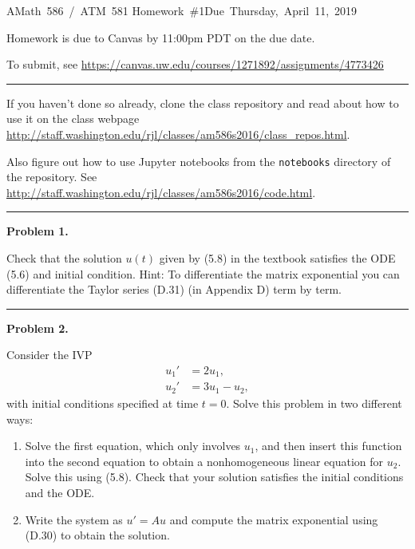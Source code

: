 \documentclass[10pt]{article}
\begin{document}
\hfill\vbox{\hbox{AMath 586 / ATM 581}
\hbox{Homework \#1}\hbox{Due Thursday, April 11, 2019}}

\vskip 5pt

Homework is due to Canvas by 11:00pm PDT on the due date.

To submit, see
\url{https://canvas.uw.edu/courses/1271892/assignments/4773426}


\vskip 1cm
\hrule
\vskip 1cm

If you haven't done so already, clone the class repository and read about how 
to use it on the class webpage
\url{http://staff.washington.edu/rjl/classes/am586s2016/class_repos.html}.

Also figure out how to use Jupyter notebooks from the {\tt notebooks} directory
of the repository.  See 
\url{http://staff.washington.edu/rjl/classes/am586s2016/code.html}.



\vskip 1cm
\hrule
{\bf Problem 1.}

Check that the solution $u(t)$ given by (5.8) in the textbook
satisfies the ODE (5.6) and
initial condition.  Hint: To differentiate the matrix exponential you can
differentiate the Taylor series (D.31) (in Appendix D) term by term.



\vskip 1cm
\hrule
{\bf Problem 2.}


Consider the IVP
\begin{equation*}
\begin{split}
u_1' &= 2u_1,\\
u_2' &= 3u_1 - u_2,
\end{split}
\end{equation*}
with initial conditions specified at time $t=0$.  Solve this problem in two
different ways:

\begin{enumerate}
\item Solve the first equation, which only involves $u_1$, and then insert
this function into the second equation to obtain a nonhomogeneous linear
equation for $u_2$.  Solve this using (5.8).  
Check that your solution satisfies the initial conditions and the ODE.

\item Write the system as $u' = Au$ and compute the matrix exponential using
(D.30) to obtain the solution.
\end{enumerate}
\end{document}
